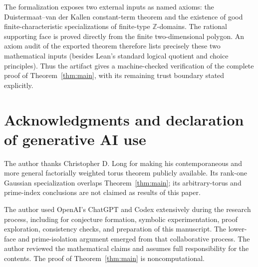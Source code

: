 \documentclass[11pt]{article}
\newcommand{\Z}{\mathbb Z}
\begin{document}
The formalization exposes two external inputs as named axioms: the
Duistermaat--van der Kallen constant-term theorem and the existence of good
finite-characteristic specializations of finite-type \(\Z\)-domains.  The
rational supporting face is proved directly from the finite
two-dimensional polygon.  An axiom audit of the exported theorem therefore
lists precisely these two mathematical inputs (besides Lean's standard
logical quotient and choice principles).  Thus the artifact gives a
machine-checked verification of the complete proof of
Theorem~\ref{thm:main}, with its remaining trust boundary stated
explicitly.

\section*{Acknowledgments and declaration of generative AI use}

The author thanks Christopher D. Long for making his contemporaneous and
more general factorially weighted torus theorem publicly available.  Its
rank-one Gaussian specialization overlaps Theorem~\ref{thm:main}; its
arbitrary-torus and prime-index conclusions are not claimed as results of
this paper.

The author used OpenAI's ChatGPT and Codex extensively during the research
process, including for conjecture formation, symbolic experimentation,
proof exploration, consistency checks, and preparation of this manuscript.
The lower-face and prime-isolation argument emerged from that collaborative
process.  The author reviewed the mathematical claims and assumes full
responsibility for the contents.  The proof of Theorem~\ref{thm:main} is
noncomputational.



\end{document}
